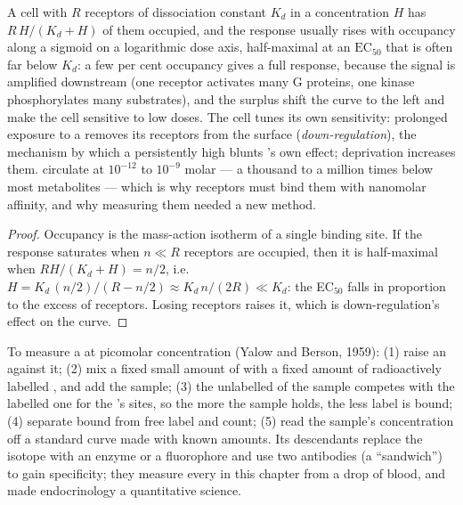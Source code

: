 \begin{proposition}\label{prop:b3:endocrinology:dose}
A cell with $R$ receptors of dissociation constant $K_{d}$ in a
 concentration $H$ has $R\,H/(K_{d} + H)$ of them occupied, and
the response usually rises with occupancy along a sigmoid on a
logarithmic dose axis, half-maximal at an $\text{EC}_{50}$ that is
often far below $K_{d}$: a few per cent occupancy gives a full
response, because the signal is amplified downstream (one receptor
activates many G proteins, one kinase phosphorylates many
substrates), and the surplus \emph{} shift the curve
to the left and make the cell sensitive to low doses. The cell tunes
its own sensitivity: prolonged exposure to a  removes its
receptors from the surface (\emph{down-regulation}), the mechanism by
which a persistently high  blunts 's own effect;
deprivation increases them.  circulate at $10^{-12}$ to
$10^{-9}$ molar --- a thousand to a million times below most
metabolites --- which is why receptors must bind them with
nanomolar affinity, and why measuring them needed a new method.
\end{proposition}
\begin{proof}
Occupancy is the mass-action isotherm of a single binding site. If
the response saturates when $n \ll R$ receptors are occupied, then it
is half-maximal when $R H/(K_{d} + H) = n/2$, i.e.\ $H = K_{d}\,
(n/2)/(R - n/2) \approx K_{d}\, n/(2R) \ll K_{d}$: the EC$_{50}$ falls
in proportion to the excess of receptors. Losing receptors raises it,
which is down-regulation's effect on the curve.
\end{proof}

\begin{method}[Radioimmunoassay]\label{met:b3:endocrinology:ria}
To measure a  at picomolar concentration (Yalow and Berson,
1959): (1) raise an  against it; (2) mix a fixed small amount
of  with a fixed amount of radioactively labelled ,
and add the sample; (3) the unlabelled  of the sample competes
with the labelled one for the 's sites, so the more  the
sample holds, the less label is bound; (4) separate bound from free
label and count; (5) read the sample's concentration off a standard
curve made with known amounts. Its descendants replace the isotope
with an enzyme or a fluorophore and use two antibodies (a ``sandwich'')
to gain specificity; they measure every  in this chapter from a
drop of blood, and made endocrinology a quantitative science.
\end{method}

